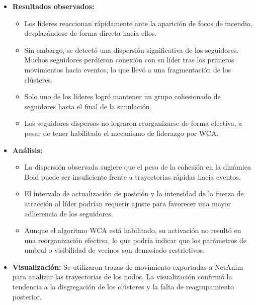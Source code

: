 \documentclass{article}
\begin{document}
\begin{itemize}
\item \textbf{Resultados observados:}
\begin{itemize}
    \item Los líderes reaccionan rápidamente ante la aparición de focos de incendio, desplazándose de forma directa hacia ellos.
    \item Sin embargo, se detectó una dispersión significativa de los seguidores. Muchos seguidores perdieron conexión con su líder tras los primeros movimientos hacia eventos, lo que llevó a una fragmentación de los clústeres.
    \item Solo uno de los líderes logró mantener un grupo cohesionado de seguidores hasta el final de la simulación.
    \item Los seguidores dispersos no lograron reorganizarse de forma efectiva, a pesar de tener habilitado el mecanismo de liderazgo por WCA.
\end{itemize}

\item \textbf{Análisis:}
\begin{itemize}
    \item La dispersión observada sugiere que el peso de la cohesión en la dinámica Boid puede ser insuficiente frente a trayectorias rápidas hacia eventos.
    \item El intervalo de actualización de posición y la intensidad de la fuerza de atracción al líder podrían requerir ajuste para favorecer una mayor adherencia de los seguidores.
    \item Aunque el algoritmo WCA está habilitado, su activación no resultó en una reorganización efectiva, lo que podría indicar que los parámetros de umbral o visibilidad de vecinos son demasiado restrictivos.
\end{itemize}

\item \textbf{Visualización:}
Se utilizaron trazas de movimiento exportadas a NetAnim para analizar las trayectorias de los nodos. La visualización confirmó la tendencia a la disgregación de los clústeres y la falta de reagrupamiento posterior.

\end{itemize}
\end{document}
